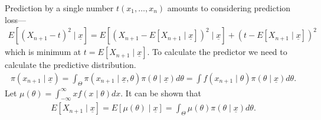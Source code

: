 Prediction by a single number $t(x_{1},\ldots,x_{n})$ amounts to considering prediction loss---
\begin{align}
    E[(X_{n+1}-t)^{2} \mid \underline{x}] = E[(X_{n+1}-E[X_{n+1} \mid \underline{x}])^{2} \mid \underline{x}] + (t-E[X_{n+1} \mid \underline{x}])^{2}
\end{align}
which is minimum at $t = E[X_{n+1} \mid \underline{x}]$. To calculate the predictor we need to calculate the predictive distribution.
\begin{align}
    \pi(x_{n+1} \mid \underline{x}) = \int_{\Theta} \pi(x_{n+1} \mid \underline{x},\theta) \pi(\theta \mid \underline{x}) d\theta = \int f(x_{n+1} \mid \theta) \pi(\theta \mid \underline{x}) d\theta.
\end{align}
Let $\mu(\theta) = \int_{-\infty}^{\infty} x f(x \mid \theta) dx$. It can be shown that
\begin{align}
    E[X_{n+1} \mid \underline{x}] = E[\mu(\theta) \mid \underline{x}] = \int_{\Theta} \mu(\theta) \pi(\theta \mid \underline{x}) d\theta.
\end{align}